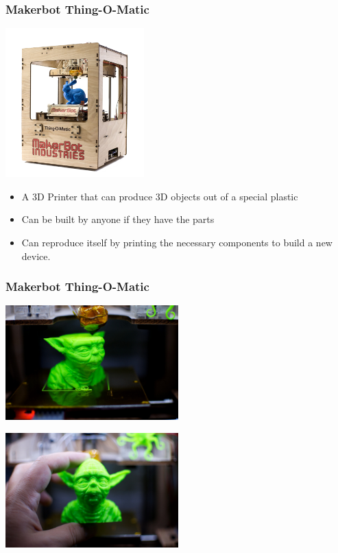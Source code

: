 \documentclass{beamer}
\begin{document}
\begin{frame}
  \frametitle{Makerbot Thing-O-Matic}
  \begin{center} \includegraphics[width=0.4\textwidth]{img/thing-o-matic} \end{center}
  \begin{itemize}
  \item A \textcolor{beamer@myblue}{3D} Printer that can produce 3D
    objects out of a special plastic
  \item Can be built by anyone if they have the parts
  \item Can \textcolor{beamer@myblue}{reproduce} itself by printing the
    necessary components to build a new device.
  \end{itemize}
\end{frame}

\begin{frame}
  \frametitle{Makerbot Thing-O-Matic}
  \begin{center} 
    \includegraphics[width=0.5\textwidth]{img/yoda}

    \includegraphics[width=0.5\textwidth]{img/yoda-2} 
  \end{center}
\end{frame}
\end{document}
